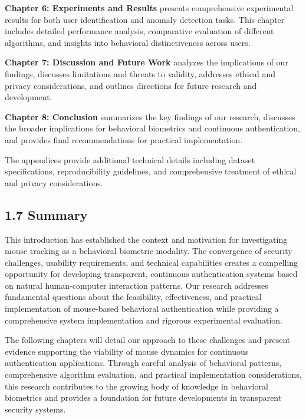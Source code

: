 \documentclass[
  11pt,
  a4paper,
]{article}
\begin{document}
\textbf{Chapter 6: Experiments and Results} presents comprehensive
experimental results for both user identification and anomaly detection
tasks. This chapter includes detailed performance analysis, comparative
evaluation of different algorithms, and insights into behavioral
distinctiveness across users.

\textbf{Chapter 7: Discussion and Future Work} analyzes the implications
of our findings, discusses limitations and threats to validity,
addresses ethical and privacy considerations, and outlines directions
for future research and development.

\textbf{Chapter 8: Conclusion} summarizes the key findings of our
research, discusses the broader implications for behavioral biometrics
and continuous authentication, and provides final recommendations for
practical implementation.

The appendices provide additional technical details including dataset
specifications, reproducibility guidelines, and comprehensive treatment
of ethical and privacy considerations.

\subsection{1.7 Summary}\label{summary}

This introduction has established the context and motivation for
investigating mouse tracking as a behavioral biometric modality. The
convergence of security challenges, usability requirements, and
technical capabilities creates a compelling opportunity for developing
transparent, continuous authentication systems based on natural
human-computer interaction patterns. Our research addresses fundamental
questions about the feasibility, effectiveness, and practical
implementation of mouse-based behavioral authentication while providing
a comprehensive system implementation and rigorous experimental
evaluation.

The following chapters will detail our approach to these challenges and
present evidence supporting the viability of mouse dynamics for
continuous authentication applications. Through careful analysis of
behavioral patterns, comprehensive algorithm evaluation, and practical
implementation considerations, this research contributes to the growing
body of knowledge in behavioral biometrics and provides a foundation for
future developments in transparent security systems.

\newpage

\newpage
\end{document}
